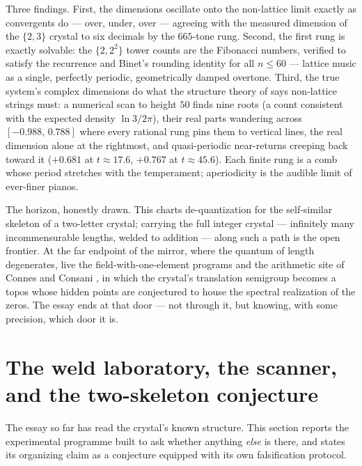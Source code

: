\documentclass[11pt]{article}
\theoremstyle{remark}
\begin{document}
Three findings. First, the dimensions oscillate onto the non-lattice limit exactly as convergents do
--- over, under, over --- agreeing with the measured dimension of the $\{2,3\}$ crystal to six
decimals by the $665$-tone rung. Second, the first rung is exactly solvable: the $\{2, 2^2\}$ tower
counts are the Fibonacci numbers, verified to satisfy the recurrence and Binet's rounding identity
for all $n \le 60$ --- lattice music as a single, perfectly periodic, geometrically damped overtone.
Third, the true system's complex dimensions do what the structure theory of \cite{LapidusBook} says
non-lattice strings must: a numerical scan to height $50$ finds nine roots (a count consistent with
the expected density $\ln 3/2\pi$), their real parts wandering across $[-0.988,\, 0.788]$ where every
rational rung pins them to vertical lines, the real dimension alone at the rightmost, and
quasi-periodic near-returns creeping back toward it ($+0.681$ at $t \approx 17.6$, $+0.767$ at
$t \approx 45.6$). Each finite rung is a comb whose period stretches with the temperament;
aperiodicity is the audible limit of ever-finer pianos.

The horizon, honestly drawn. This charts de-quantization for the self-similar skeleton of a
two-letter crystal; carrying the full integer crystal --- infinitely many incommensurable lengths,
welded to addition --- along such a path is the open frontier. At the far endpoint of the mirror,
where the quantum of length degenerates, live the field-with-one-element programs and the arithmetic
site of Connes and Consani \cite{ConnesConsani}, in which the crystal's translation semigroup becomes
a topos whose hidden points are conjectured to house the spectral realization of the zeros. The essay
ends at that door --- not through it, but knowing, with some precision, which door it is.

\section{The weld laboratory, the scanner, and the two-skeleton conjecture}

The essay so far has read the crystal's known structure. This section reports the experimental
programme built to ask whether anything \emph{else} is there, and states its organizing claim as a
conjecture equipped with its own falsification protocol.
\end{document}
